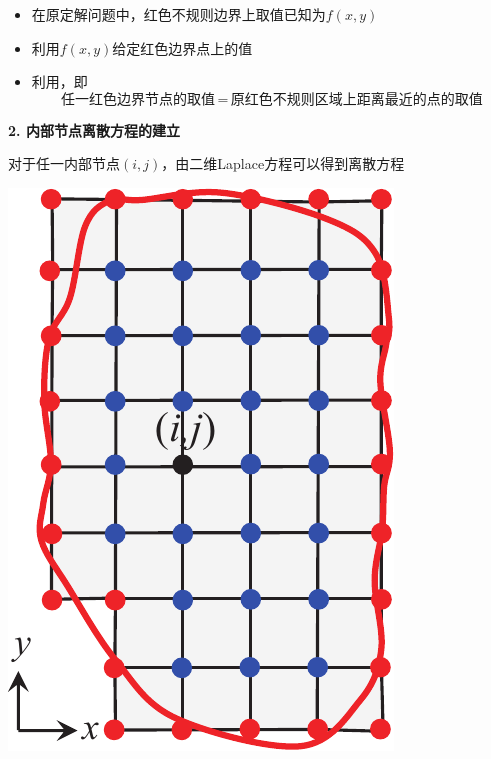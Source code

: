 \begin{minipage}{0.7\linewidth}
	\vspace*{1em}
	\begin{itemize}
		\item 在原定解问题中，红色不规则边界上取值已知为$f(x,y)$
		\item 利用$f(x,y)$给定红色边界点上的值
		\item 利用，即
		\begin{equation*}
			\mbox{任一红色边界节点的取值}\,=\,\mbox{原红色不规则区域上距离最近的点的取值}
		\end{equation*}
	\end{itemize}

\hspace*{-2em} \textbf{2. 内部节点离散方程的建立}
\vspace*{0.5em}

对于任一内部节点$(i,j)$，由二维Laplace方程可以得到离散方程
\end{minipage}
\begin{minipage}{0.25\linewidth}
	\centering
	\includegraphics[width=0.8\linewidth]{pic/离散边界.pdf}
	\vspace*{-1em}
\end{minipage}
\vspace*{0.5em}


